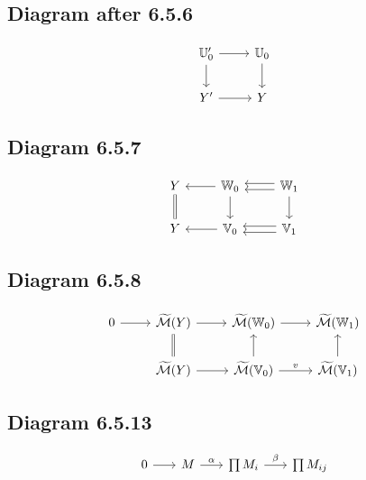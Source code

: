 \documentclass[leqno]{amsart}
\begin{document}
	\subsection*{Diagram after 6.5.6}

	\begin{equation*}
		\begin{tikzcd}
			\mathbb{U}_{0}^{\prime} \arrow{r} \arrow{d} & \mathbb{U}_0 \arrow{d} \\
			Y^{\prime} \arrow{r} & Y
		\end{tikzcd}
	\end{equation*}

	\subsection*{Diagram 6.5.7}

	\begin{equation*}
		\begin{tikzcd}
			Y \arrow[equals]{d} & \mathbb{W}_0 \arrow{l} \arrow{d} & \mathbb{W}_1 \arrow{d} \arrow[shift right]{l} \arrow[shift left]{l} \\ 
			Y & \mathbb{V}_0 \arrow{l} & \mathbb{V}_1 \arrow[shift right]{l} \arrow[shift left]{l}
		\end{tikzcd}
	\end{equation*}

	\subsection*{Diagram 6.5.8}

	\begin{equation*}
		\begin{tikzcd}
			0 \arrow{r} & \widetilde{\mathcal{M}}(Y) \arrow[equals]{d} \arrow{r} & \widetilde{\mathcal{M}}(\mathbb{W}_0) \arrow{r} & \widetilde{\mathcal{M}}(\mathbb{W}_1) \\ 
			& \widetilde{\mathcal{M}}(Y) \arrow{r} & \widetilde{\mathcal{M}}(\mathbb{V}_0) \arrow{r}{v} \arrow{u} & \widetilde{\mathcal{M}}(\mathbb{V}_1) \arrow{u}
		\end{tikzcd}
	\end{equation*}

	\subsection*{Diagram 6.5.13}

	\begin{equation*}
		\begin{tikzcd}[sep=scriptsize]
			0 \arrow{r} & M \arrow{r}{\alpha} & \prod M_i \arrow{r}{\beta} & \prod M_{ij}
		\end{tikzcd}
	\end{equation*}
\end{document}
